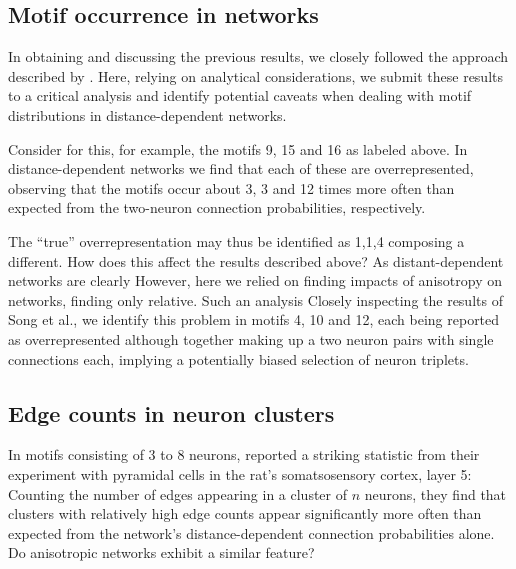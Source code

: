 \subsection*{Motif occurrence in networks}

In obtaining and discussing the previous results, we closely followed
the approach described by \textcite{Song2005}. Here, relying on
analytical considerations, we submit these results to a critical
analysis and identify potential caveats when dealing with motif
distributions in distance-dependent networks.

Consider for this, for example, the motifs 9, 15 and 16 as labeled
above. In distance-dependent networks we find that each of these are
overrepresented, observing that the motifs occur about 3, 3 and 12
times more often than expected from the two-neuron connection
probabilities, respectively.





The \enquote{true} overrepresentation may thus be identified as 1,1,4
composing a different. How does this affect the results described
above? As distant-dependent networks are clearly However, here we
relied on finding impacts of anisotropy on networks, finding only
relative. Such an analysis Closely inspecting the results of Song et
al., we identify this problem in motifs 4, 10 and 12, each being
reported as overrepresented although together making up a two neuron
pairs with single connections each, implying a potentially biased
selection of neuron triplets.








\subsection*{Edge counts in neuron clusters}

In motifs consisting of 3 to 8 neurons, \textcite{Perin2011} reported
a striking statistic from their experiment with pyramidal cells in the
rat's somatsosensory cortex, layer 5: Counting the number of edges
appearing in a cluster of $n$ neurons, they find that clusters with
relatively high edge counts appear significantly more often than
expected from the network's distance-dependent connection
probabilities alone. Do anisotropic networks exhibit a similar
feature?

